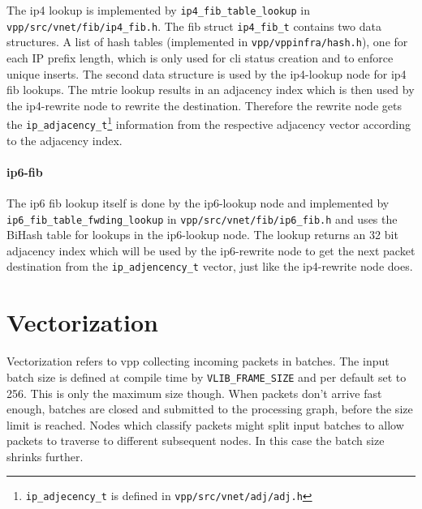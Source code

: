 

The \Ac{ip4} lookup is implemented by \lstinline|ip4_fib_table_lookup|
in \lstinline|vpp/src/vnet/fib/ip4_fib.h|. The \Ac{fib} struct
\lstinline|ip4_fib_t| contains two data structures. A list of hash
tables (implemented in \lstinline|vpp/vppinfra/hash.h|), one for each
IP prefix length, which is only used for \Ac{cli} status creation and
to enforce unique inserts. The second data structure is used by the
ip4-lookup node for \Ac{ip4} \Ac{fib} lookups. The mtrie lookup
results in an adjacency index which is then used by the ip4-rewrite
node to rewrite the destination. Therefore the rewrite node gets the
\lstinline|ip_adjacency_t|\footnote{\lstinline|ip_adjecency_t| is
defined in \lstinline|vpp/src/vnet/adj/adj.h|} information from the
respective adjacency vector according to the adjacency index.


\paragraph{\Ac{ip6}-fib}

The \Ac{ip6} \Ac{fib} lookup itself is done by the ip6-lookup node and
implemented by \lstinline|ip6_fib_table_fwding_lookup| in
\lstinline|vpp/src/vnet/fib/ip6_fib.h| and uses the BiHash table for
lookups in the ip6-lookup node. The lookup returns an 32 bit adjacency
index which will be used by the ip6-rewrite node to get the next
packet destination from the \lstinline|ip_adjencency_t| vector, just
like the ip4-rewrite node does.



\section{Vectorization}
\label{sec:vectorization}


Vectorization refers to \Ac{vpp} collecting incoming packets in
batches. The input batch size is defined at compile time by
\lstinline|VLIB_FRAME_SIZE| and per default set to 256. This is only
the maximum size though. When packets don't arrive fast enough,
batches are closed and submitted to the processing graph, before the
size limit is reached. Nodes which classify packets might split input
batches  to allow packets to traverse to different subsequent nodes.
In this case the batch size shrinks further.

